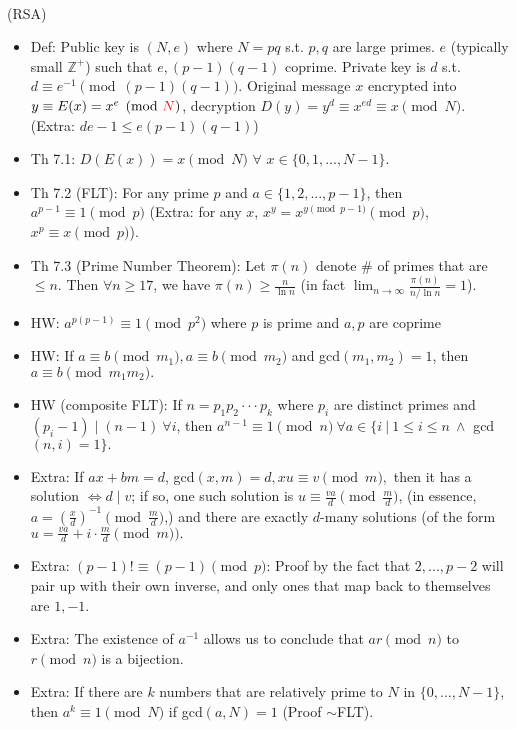\documentclass{article}
\begin{document}
\\
(RSA)
\begin{itemize}
	\item Def: Public key is $(N,e)$ where $N = pq$ s.t. $p,q$ are large primes. $e$ (typically small $\mathbb{Z^+}$) such that $e,(p-1)(q-1)$ coprime. Private key is $d$ s.t. $d\equiv e^{-1}\pmod{(p-1)(q-1)}$. Original message $x$ encrypted into $y\equiv E(x) = x^e\pmod{{\color{red} N}}$, decryption $D(y) = y^d\equiv x^{ed}\equiv x\pmod{N}$.
	(Extra: $de-1\leq e(p-1)(q-1)$)
	\item Th 7.1: $D(E(x)) = x \pmod{N}$ $\forall$ $x \in \{0,1,...,N-1\}$.
	\item Th 7.2 (FLT): For any prime $p$ and $a\in\{1,2,...,p-1\}$, then $a^{p-1}\equiv 1 \pmod{p}$ (Extra: for any $x$, $x^y = x^{y\pmod{p-1}}\pmod{p}$, $x^p\equiv x\pmod{p}$).
	\item Th 7.3 (Prime Number Theorem): Let $\pi(n)$ denote \# of primes that are $\leq n$. Then $\forall n\geq17$, we have $\pi(n)\geq \frac{n}{\ln n}$ (in fact $\lim_{n\to\infty}\frac{\pi(n)}{n/\ln n} = 1$).
	\item HW: $a^{p(p-1)}\equiv1\pmod{p^2}$ where $p$ is prime and $a,p$ are coprime
	\item HW: If $a\equiv b\pmod{m_1}, a\equiv b\pmod{m_2}$ and gcd$(m_1, m_2) = 1$, then $a\equiv b\pmod{m_1m_2}.$
	\item HW (composite FLT): If $n = p_1p_2\cdot\cdot\cdot p_k$ where $p_i$ are distinct primes and $(p_i - 1)\mid(n - 1)\ \forall i$, then $a^{n-1}\equiv1\pmod{n}\ \forall a\in\{i\ |\ 1\leq i\leq n\ \land$ gcd$(n,i) = 1\}.$
	\item Extra: If $ax+bm = d$, gcd$(x,m) = d, xu\equiv v\pmod{m},$ then it has a solution $\iff d\mid v$; if so, one such solution is $u\equiv\frac{va}{d}\pmod{\frac{m}{d}}$, (in essence, $a = (\frac{x}{d})^{-1}\pmod{\frac{m}{d}}$,) and there are exactly {\large$d$}-many solutions (of the form $u = \frac{va}{d} + i\cdot\frac{m}{d}\pmod{m}).$
	\item Extra: $(p-1)!\equiv(p-1)\pmod{p}$: Proof by the fact that $2,...,p-2$ will pair up with their own inverse, and only ones that map back to themselves are $1, -1$.
	\item Extra: The existence of $a^{-1}$ allows us to conclude that $ar\pmod{n}$ to $r\pmod{n}$ is a bijection.
	\item Extra: If there are $k$ numbers that are relatively prime to $N$ in $\{0,\dots,N-1\}$, then $a^k\equiv1\pmod{N}$ if gcd$(a,N)=1$ (Proof $\sim$FLT).
\end{itemize}
\end{document}
